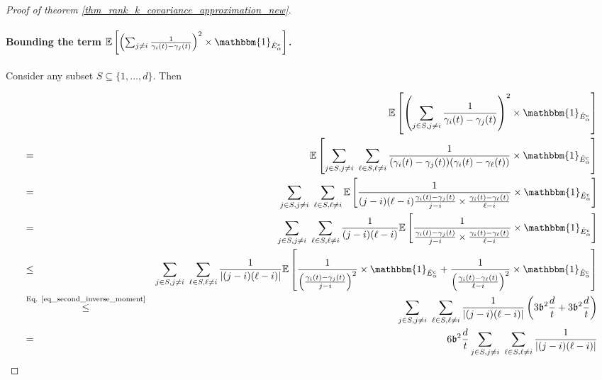 \documentclass[11pt,letterpaper]{article}
\begin{document}
\begin{proof}[Proof of theorem \ref{thm_rank_k_covariance_approximation_new}]
\paragraph{Bounding the term $\mathbb{E}\left[  \left(\sum_{j \neq i} \frac{1}{\gamma_i(t) - \gamma_j(t)}\right)^2 \times \mathbbm{1}_{\hat{E}_\alpha^c} \right]$.}

Consider any subset $S \subseteq \{1,\ldots,d\}$.
%
Then

\begin{eqnarray}\label{eq_v2}
    & &   \!\! \! \!\!\!\!\!\!\!\!\!\!\!\!\!\!\!\! \! \!\! \! \!\!\!\!\!\!\!\!\!\!\!\!\!\!\!\! \! \! \mathbb{E}\left[  \left(\sum_{j \in S, j \neq i} \frac{1}{\gamma_i(t) - \gamma_j(t)}\right)^2 \times \mathbbm{1}_{\hat{E}_\alpha^c} \right] \nonumber\\
    &=&   \mathbb{E}\left[  \sum_{j \in S, j \neq i} \, \, \sum_{\ell \in S, \ell \neq i} \frac{1}{(\gamma_i(t) - \gamma_j(t))(\gamma_i(t) - \gamma_\ell(t))}  \times \mathbbm{1}_{\hat{E}_\alpha^c} \right] \nonumber\\
    & = &  \sum_{j \in S, j \neq i} \, \, \sum_{\ell \in S, \ell \neq i}   \mathbb{E}\left[ \frac{1}{(j-i)(
    \ell - i)\frac{\gamma_i(t) - \gamma_j(t)}{j-i}\times \frac{\gamma_i(t) - \gamma_\ell(t)}{\ell-i}}  \times \mathbbm{1}_{\hat{E}_\alpha^c} \right] \nonumber\\
     & =&   \sum_{j \in S, j \neq i} \, \, \sum_{\ell \in S, \ell \neq i}  \frac{1}{(j-i)(
    \ell - i)}\mathbb{E}\left[ \frac{1}{\frac{\gamma_i(t) - \gamma_j(t)}{j-i} \times \frac{\gamma_i(t) - \gamma_\ell(t)}{\ell-i}}  \times \mathbbm{1}_{\hat{E}_\alpha^c} \right] \nonumber\\
    &\leq & \sum_{j \in S, j \neq i} \, \, \sum_{\ell \in S, \ell \neq i}   \frac{1}{|(j-i)(
    \ell - i)|} \mathbb{E}\left[ \frac{1}{\left(\frac{\gamma_i(t) - \gamma_j(t)}{j-i}\right)^2} \times \mathbbm{1}_{\hat{E}_\alpha^c}  +  \frac{1}{ \left(\frac{\gamma_i(t) - \gamma_\ell(t)}{\ell-i}\right)^2}  \times \mathbbm{1}_{\hat{E}_\alpha^c} \right] \label{eq_n149}\\
    &\stackrel{\textrm{Eq. \eqref{eq_second_inverse_moment}}}{\leq} &
     \sum_{j \in S, j \neq i} \, \, \sum_{\ell \in S, \ell \neq i}   \frac{1}{|(j-i)(
    \ell - i)|}\left(3 \mathfrak{b}^2\frac{ d}{t} + 3 \mathfrak{b}^2\frac{ d}{t}\right) \nonumber\\
    &= & 6 \mathfrak{b}^2 \frac{d}{t}  \sum_{j \in S, j \neq i} \, \, \sum_{\ell \in S, \ell \neq i}  \frac{1}{|(j-i)(
    \ell - i)|} \nonumber\\

\end{eqnarray}
\end{proof}
\end{document}
